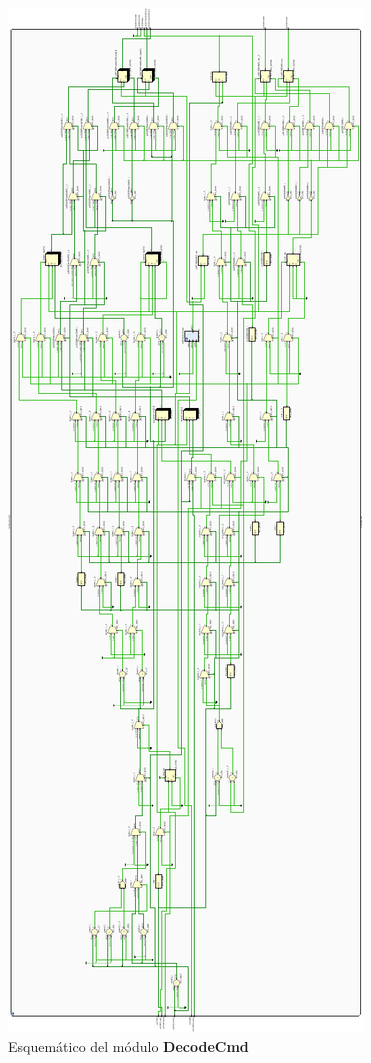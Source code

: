 \documentclass[12pt]{article}
\begin{document}
\begin{figure}[H]
    \centering
    \includegraphics[angle=270, width=\textwidth]{decode-cmd-crop}
    \caption{Esquemático del módulo \textbf{DecodeCmd}}
\end{figure}
\end{document}
